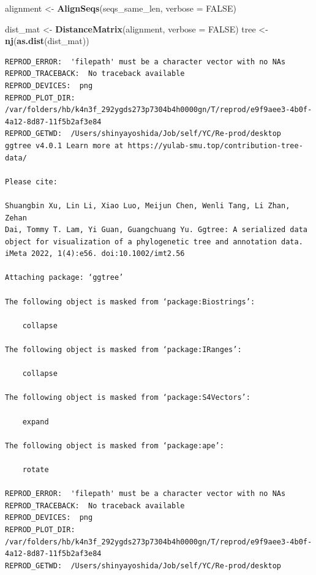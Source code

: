 \documentclass[
  11pt,
]{article}
\newenvironment{Shaded}{\begin{snugshade}}{\end{snugshade}}
\newcommand{\AttributeTok}[1]{\textcolor[rgb]{0.13,0.29,0.53}{#1}}
\newcommand{\ConstantTok}[1]{\textcolor[rgb]{0.56,0.35,0.01}{#1}}
\newcommand{\FunctionTok}[1]{\textcolor[rgb]{0.13,0.29,0.53}{\textbf{#1}}}
\newcommand{\NormalTok}[1]{#1}
\newcommand{\OtherTok}[1]{\textcolor[rgb]{0.56,0.35,0.01}{#1}}
\newenvironment{rpoutput}{\vspace{0.5em}\begin{snugshade}}{\end{snugshade}}
\begin{document}
\begin{Shaded}
\begin{Highlighting}[]
\NormalTok{alignment }\OtherTok{\textless{}{-}} \FunctionTok{AlignSeqs}\NormalTok{(seqs\_same\_len, }\AttributeTok{verbose =} \ConstantTok{FALSE}\NormalTok{)}

\NormalTok{dist\_mat }\OtherTok{\textless{}{-}} \FunctionTok{DistanceMatrix}\NormalTok{(alignment, }\AttributeTok{verbose =} \ConstantTok{FALSE}\NormalTok{)}
\NormalTok{tree }\OtherTok{\textless{}{-}} \FunctionTok{nj}\NormalTok{(}\FunctionTok{as.dist}\NormalTok{(dist\_mat))}
\end{Highlighting}
\end{Shaded}

\begin{rpoutput}

\begin{verbatim}
REPROD_ERROR:  'filepath' must be a character vector with no NAs 
REPROD_TRACEBACK:  No traceback available  
REPROD_DEVICES:  png 
REPROD_PLOT_DIR:  /var/folders/hb/k4n3f_292ygds273p7304b4h0000gn/T/reprod/e9f9aee3-4b0f-4a12-8d87-11f5b2af3e84 
REPROD_GETWD:  /Users/shinyayoshida/Job/self/YC/Re-prod/desktop 
ggtree v4.0.1 Learn more at https://yulab-smu.top/contribution-tree-data/

Please cite:

Shuangbin Xu, Lin Li, Xiao Luo, Meijun Chen, Wenli Tang, Li Zhan, Zehan
Dai, Tommy T. Lam, Yi Guan, Guangchuang Yu. Ggtree: A serialized data
object for visualization of a phylogenetic tree and annotation data.
iMeta 2022, 1(4):e56. doi:10.1002/imt2.56

Attaching package: ‘ggtree’

The following object is masked from ‘package:Biostrings’:

    collapse

The following object is masked from ‘package:IRanges’:

    collapse

The following object is masked from ‘package:S4Vectors’:

    expand

The following object is masked from ‘package:ape’:

    rotate

REPROD_ERROR:  'filepath' must be a character vector with no NAs 
REPROD_TRACEBACK:  No traceback available  
REPROD_DEVICES:  png 
REPROD_PLOT_DIR:  /var/folders/hb/k4n3f_292ygds273p7304b4h0000gn/T/reprod/e9f9aee3-4b0f-4a12-8d87-11f5b2af3e84 
REPROD_GETWD:  /Users/shinyayoshida/Job/self/YC/Re-prod/desktop 
\end{verbatim}

\end{rpoutput}
\end{document}
